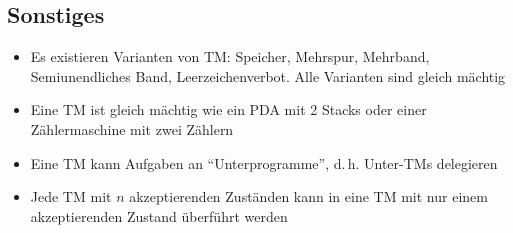 \subsection{Sonstiges}
\begin{itemize}\itemsep0em
	\item Es existieren Varianten von TM: Speicher, Mehrspur, Mehrband, Semiunendliches Band, Leerzeichenverbot. Alle Varianten sind gleich mächtig
	\item Eine TM ist gleich mächtig wie ein PDA mit 2 Stacks oder einer Zählermaschine mit zwei Zählern
	\item Eine TM kann Aufgaben an \enquote{Unterprogramme}, d.\,h. Unter-TMs delegieren
	\item Jede TM mit $n$ akzeptierenden Zuständen kann in eine TM mit nur einem akzeptierenden Zustand überführt werden
\end{itemize}

